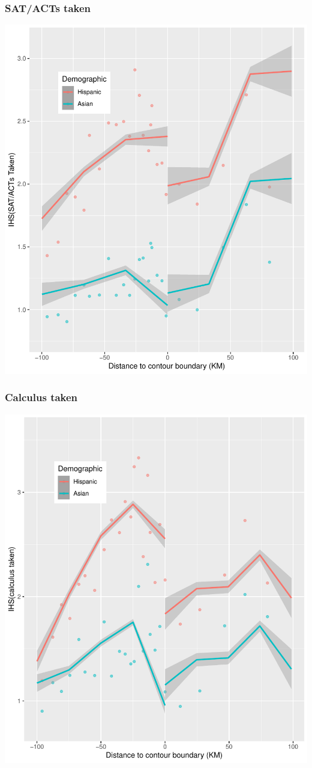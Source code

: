 \documentclass{beamer}
\begin{document}
\begin{frame}
\frametitle{SAT/ACTs taken}
\begin{center}
\includegraphics[width=.6\textwidth]{../../analysis/Output/graphs/satact.pdf} 
\end{center}
\end{frame}

\begin{frame}
\frametitle{Calculus taken}
\begin{center}
\includegraphics[width=.6\textwidth]{../../analysis/Output/graphs/mathenr.pdf} 
\end{center}
\end{frame}
\end{document}
